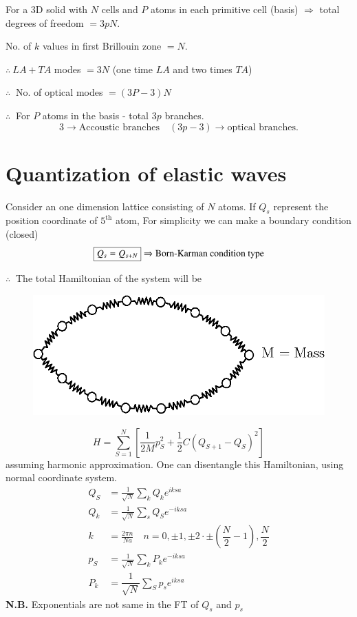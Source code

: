 For a 3D solid with $N$ cells and $P$ atoms in each primitive cell (basis) $\Rightarrow$ total degrees of freedom $=3pN$.

No. of $k$ values in first Brillouin zone $=N$.

$\therefore \ LA+TA$ modes $=3N$ (one time $LA$ and two times $TA$)

$\therefore \ $ No. of optical modes $=(3P-3)N$

$\therefore \ $ For $P$ atoms in the basis - total $3p$ branches.
$$
3\to \text{Accoustic branches}\quad (3p-3) \to \text{optical branches.}
$$

\section*{Quantization of elastic waves}

Consider an one dimension lattice consisting of $N$ atoms. If $Q_{s}$ represent the position coordinate of $5^{\text{th}}$ atom, For simplicity we can make a boundary condition (closed)
$$
\fbox{$Q_{s}=Q_{s+N}$} \Rightarrow \text{Born-Karman condition type}
$$

$\therefore \ $ The total Hamiltonian of the system will be
\begin{figure}[H]
\centering
\includegraphics{images/lecture18/fig6.eps}
\end{figure}
$$
H=\sum\limits^{N}_{S=1}\left[\frac{1}{2M}p^{2}_{S}+\frac{1}{2}C(Q_{S+1}-Q_{S})^{2}\right]
$$
assuming harmonic approximation. One can disentangle this Hamiltonian, using normal coordinate system.
\begin{align*}
Q_{S} &= \frac{1}{\sqrt{N}}\sum\limits_{k}Q_{k}e^{iksa}\\[2pt]
Q_{k} &= \frac{1}{\sqrt{N}}\sum\limits_{s}Q_{S}e^{-iksa}\\[2pt]
k &= \frac{2\pi n}{Na}\quad n=0, \pm 1, \pm 2\cdot \pm \left(\dfrac{N}{2}-1\right), \dfrac{N}{2}\\[2pt]
p_{S} &= \frac{1}{\sqrt{N}}\sum\limits_{k}P_{k}e^{-iksa}\\[2pt]
P_{k} &= \dfrac{1}{\sqrt{N}}\sum\limits_{S}p_{s}e^{iksa}
\end{align*}
{\bf N.B.} Exponentials are not same in the FT of $Q_{s}$ and $p_{s}$

